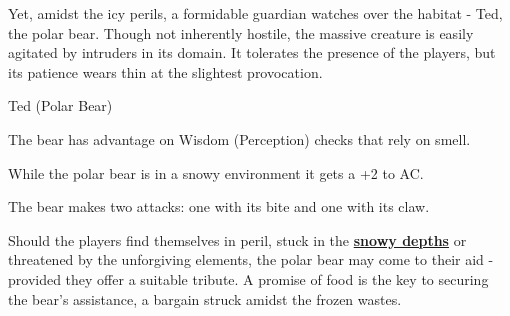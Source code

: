 Yet, amidst the icy perils, a formidable guardian watches over the habitat - Ted, the polar bear. Though not inherently hostile, the massive creature is easily agitated by intruders in its domain. It tolerates the presence of the players, but its patience wears thin at the slightest provocation.
\begin{DndMonster}[width=0.5\textwidth]{Ted (Polar Bear)}

	\DndMonsterBasics[
		armor-class = {14 (Natural Armor)},
		hit-points  = {\DndDice{8d10 + 24}},
		speed       = {40 ft., swim 30 ft.},
	]

	\renewcommand{\AbilityScoreSpacer}{~}

	\DndMonsterAbilityScores[
		str = 20,
		dex = 10,
		con = 16,
		int = 2,
		wis = 13,
		cha = 7,
	]

	\DndMonsterDetails[
		skills = {Perception +3},
		damage-resistances = {cold},
		senses = {passive Perception 13},
		languages = {Common},
		challenge = 5,
	]

	The bear has advantage on Wisdom (Perception) checks that rely on smell.

	While the polar bear is in a snowy environment it gets a +2 to AC.
	
	The bear makes two attacks: one with its bite and one with its claw.   

	\DndMonsterAttack[
		name=Bite,
		distance=melee, %
		mod=+7,
		reach=5,
		targets=one target,
		dmg={\DndDice{1d8 + 5}},
		dmg-type=piercing,
	]
	
	\DndMonsterAttack[
		name=Claws,
		distance=melee, %
		mod=+7,
		reach=5,
		targets=one target,
		dmg={\DndDice{2d6 + 5}},
		dmg-type=slashing,
	] 
\end{DndMonster}
Should the players find themselves in peril, stuck in the \hyperref[sec:PowderedSnow]{\textbf{snowy depths}} or threatened by the unforgiving elements, the polar bear may come to their aid - provided they offer a suitable tribute. A promise of food is the key to securing the bear's assistance, a bargain struck amidst the frozen wastes.

